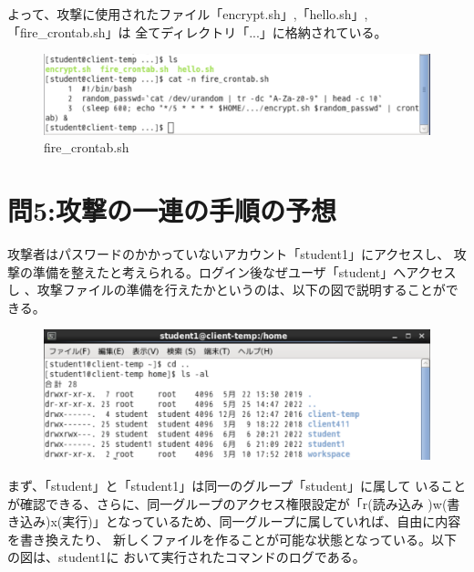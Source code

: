 \documentclass[dvipdfmx,autodetect-engine,titlepage]{jsarticle}
\begin{document}
よって、攻撃に使用されたファイル「encrypt.sh」,「hello.sh」,「fire\_crontab.sh」は
全てディレクトリ「...」に格納されている。

\begin{figure}[h]
  \centering
  \includegraphics[scale=0.6]{pic11.png}
  \caption{fire\_crontab.sh}
\end{figure}


\section{問5:攻撃の一連の手順の予想}
攻撃者はパスワードのかかっていないアカウント「student1」にアクセスし、
攻撃の準備を整えたと考えられる。ログイン後なぜユーザ「student」へアクセスし
、攻撃ファイルの準備を行えたかというのは、以下の図で説明することができる。

\begin{figure}[h]
  \centering
  \includegraphics[scale=0.6]{pic12.png}
  \caption{}
\end{figure}

まず、「student」と「student1」は同一のグループ「student」に属して
いることが確認できる、さらに、同一グループのアクセス権限設定が「r(読み込み
)w(書き込み)x(実行)」となっているため、同一グループに属していれば、自由に内容を書き換えたり、
新しくファイルを作ることが可能な状態となっている。以下の図は、student1に
おいて実行されたコマンドのログである。
\end{document}
